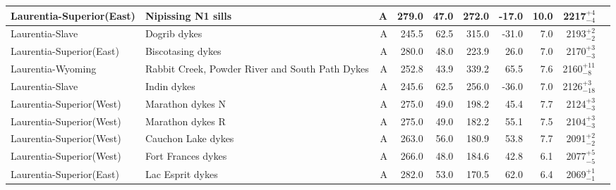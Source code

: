 \begin{longtable}{p{1 in}p{1 in}rrrrrrrp{1.5 in}}
      Laurentia-Superior(East) &                               Nipissing N1 sills &      A &     279.0 &      47.0 & 272.0 & -17.0 &      10.0 &     2217$^{+4}_{-4}$ &                                 \cite{Buchan2000a} \\ \hline
               Laurentia-Slave &                                     Dogrib dykes &      A &     245.5 &      62.5 & 315.0 & -31.0 &       7.0 &     2193$^{+2}_{-2}$ &                               \cite{Mitchell2014a} \\ \hline
      Laurentia-Superior(East) &                                Biscotasing dykes &      A &     280.0 &      48.0 & 223.9 &  26.0 &       7.0 &     2170$^{+3}_{-3}$ &                                  \cite{Evans2010a} \\ \hline
             Laurentia-Wyoming &  Rabbit Creek, Powder River and South Path Dykes &      A &     252.8 &      43.9 & 339.2 &  65.5 &       7.6 &    2160$^{+11}_{-8}$ &                                 \cite{Kilian2015a} \\ \hline
               Laurentia-Slave &                                      Indin dykes &      A &     245.6 &      62.5 & 256.0 & -36.0 &       7.0 &    2126$^{+3}_{-18}$ &                                 \cite{Buchan2016a} \\ \hline
      Laurentia-Superior(West) &                                 Marathon dykes N &      A &     275.0 &      49.0 & 198.2 &  45.4 &       7.7 &     2124$^{+3}_{-3}$ &                                  \cite{Halls2008a} \\ \hline
      Laurentia-Superior(West) &                                 Marathon dykes R &      A &     275.0 &      49.0 & 182.2 &  55.1 &       7.5 &     2104$^{+3}_{-3}$ &                                  \cite{Halls2008a} \\ \hline
      Laurentia-Superior(West) &                               Cauchon Lake dykes &      A &     263.0 &      56.0 & 180.9 &  53.8 &       7.7 &     2091$^{+2}_{-2}$ &                                  \cite{Evans2010a} \\ \hline
      Laurentia-Superior(West) &                               Fort Frances dykes &      A &     266.0 &      48.0 & 184.6 &  42.8 &       6.1 &     2077$^{+5}_{-5}$ &                                  \cite{Evans2010a} \\ \hline
      Laurentia-Superior(East) &                                 Lac Esprit dykes &      A &     282.0 &      53.0 & 170.5 &  62.0 &       6.4 &     2069$^{+1}_{-1}$ &                                  \cite{Evans2010a} \\ \hline

\end{longtable}
